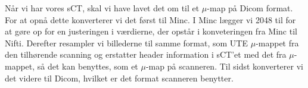 Når vi har vores sCT, skal vi have lavet det om til et $\mu$-map
på Dicom format. For at opnå dette konverterer vi det først til
Minc. I Minc lægger vi 2048 til for at gøre op for en justeringen i
værdierne, der opstår i konveteringen fra Minc til Nifti. Derefter
resampler vi billederne til samme format, som UTE $\mu$-mappet fra den
tilhørende scanning og erstatter header information i sCT'et med det fra
$\mu$-mappet, så det kan benyttes, som et $\mu$-map på scanneren. Til
sidst konverterer vi det videre til Dicom, hvilket er det format scanneren
benytter.








